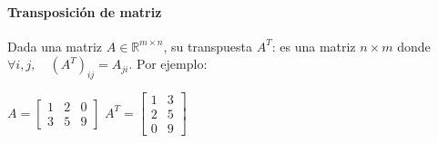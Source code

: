\paragraph{Transposición de matriz} Dada una matriz $A \in \mathbb{R}^{m \times n}$, su transpuesta $A^T$: es una matriz $n \times m$ donde $\forall i, j, \quad (A^T)_{ij} = A_{ji}$. Por ejemplo:
\begin{table}[h]
\centering
$A = \begin{bmatrix}
1 & 2 & 0 \\ 3 & 5 & 9
\end{bmatrix}$
\qquad \qquad \qquad
$A^T = \begin{bmatrix}
1 & 3 \\ 2 & 5 \\ 0 & 9
\end{bmatrix} $
\end{table}
